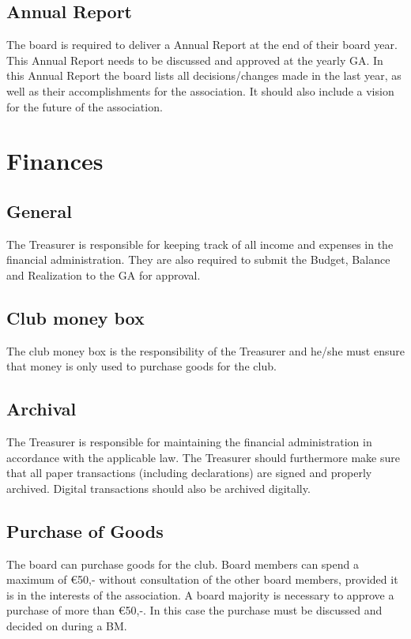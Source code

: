 \documentclass[a4paper]{article}
\newcommand{\Ajv}{Annual Report} %
\begin{document}
\subsection{\Ajv}
The board is required to deliver a { \Ajv} at the end of their board year. This { \Ajv} needs to be discussed and approved at the yearly { GA}. In this { \Ajv} the board lists all decisions/changes made in the last year, as well as their accomplishments for the association. It should also include a vision for the future of the association.

\section{Finances}
\subsection{General}
The Treasurer is responsible for keeping track of all income and expenses in the financial administration. They are also required to submit the Budget, Balance and Realization to the { GA} for approval.

\subsection{Club money box}
The club money box is the responsibility of the Treasurer and he/she must ensure that money is only used to purchase goods for the club.

\subsection{Archival}
The Treasurer is responsible for maintaining the financial administration in accordance with the applicable law. The Treasurer should furthermore make sure that all paper transactions (including declarations) are signed and properly archived. Digital transactions should also be archived digitally.

\subsection{Purchase of Goods}
The board can purchase goods for the club. Board members can spend a maximum of €50,- without consultation of the other board members, provided it is in the interests of the association. A board majority is necessary to approve a purchase of more than €50,-. In this case the purchase must be discussed and decided on during a { BM}. \\
\end{document}
